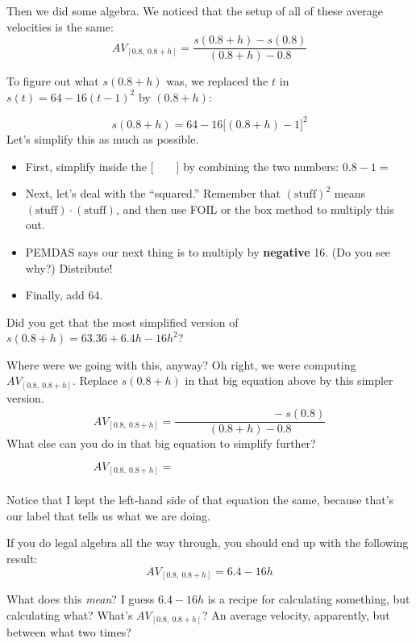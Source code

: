 \pagebreak

Then we did some algebra. We noticed that the setup of all of these average velocities is the same:
{\large
\[ AV_{[0.8,\  0.8+h]} = \dfrac{s(0.8 + h) - s(0.8)}{(0.8+h) - 0.8} \]
}

To figure out what $s(0.8 + h)$ was, we replaced the $t$ in $s(t) = 64 - 16(t-1)^2$ by $(0.8 + h)$:

\[s(0.8 + h) = 64 - 16\Big[ (0.8 + h) - 1 \Big]^2\]
Let's simplify this as much as possible. 

\begin{itemize}
\item First, simplify inside the $\big[\qquad \big]$ by combining the two numbers: $0.8 - 1 = $
\item Next, let's deal with the ``squared.'' Remember that $(\text{stuff})^2$ means $(\text{stuff}) \cdot (\text{stuff})$, and then use FOIL or the box method to multiply this out.
\item PEMDAS says our next thing is to multiply by \textbf{negative} 16. (Do you see why?) Distribute!
\item Finally, add 64.
\end{itemize}
Did you get that the most simplified version of $s(0.8+h) = 63.36 + 6.4h - 16h^2$?

\hrulefill

Where were we going with this, anyway? Oh right, we were computing $AV_{[0.8,\  0.8+h]}$. Replace $s(0.8 +h)$ in that big equation above by this simpler version.
{\large
\[ AV_{[0.8,\  0.8+h]} = \dfrac{\phantom{63.36 + 6.4h - 16h^2} - s(0.8)}{(0.8+h) - 0.8} \]
}
What else can you do in that big equation to simplify further?
{\large
\[ AV_{[0.8,\  0.8+h]} = \phantom{\dfrac{\phantom{63.36 + 6.4h - 16h^2} - s(0.8)}{(0.8+h) - 0.8}} \]
}

Notice that I kept the left-hand side of that equation the same, because that's our label that tells us what we are doing. 

\hrulefill

If you do legal algebra all the way through, you should end up with the following result:
{\large
\[AV_{[0.8,\  0.8+h]} = 6.4 - 16h\]
}

What does this \textit{mean}? I guess $6.4-16h$ is a recipe for calculating something, but calculating what? What's $AV_{[0.8,\  0.8+h]}$? An average velocity, apparently, but between what two times?
